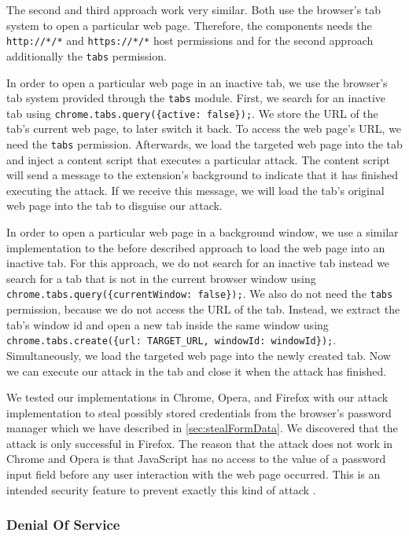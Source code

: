 	The second and third approach work very similar. Both use the browser's tab system to open a particular web page. Therefore, the components needs the \texttt{http://*/*} and \texttt{https://*/*} host permissions and for the second approach additionally the \texttt{tabs} permission.
	
	In order to open a particular web page in an inactive tab, we use the browser's tab system provided through the \texttt{tabs} module. First, we search for an inactive tab using \lstinline|chrome.tabs.query({active: false});|. We store the URL of the tab's current web page, to later switch it back. To access the web page's URL, we need the \texttt{tabs} permission. Afterwards, we load the targeted web page into the tab and inject a content script that executes a particular attack. The content script will send a message to the extension's background to indicate that it has finished executing the attack. If we receive this message, we will load the tab's original web page into the tab to disguise our attack.
	
	In order to open a particular web page in a background window, we use a similar implementation to the before described approach to load the web page into an inactive tab. For this approach, we do not search for an inactive tab instead we search for a tab that is not in the current browser window using \lstinline|chrome.tabs.query({currentWindow: false});|. We also do not need the \texttt{tabs} permission, because we do not access the URL of the tab. Instead, we extract the tab's window id and open a new tab inside the same window using \lstinline|chrome.tabs.create({url: TARGET_URL, windowId: windowId});|. Simultaneously, we load the targeted web page into the newly created tab. Now we can execute our attack in the tab and close it when the attack has finished.
	
	We tested our implementations in Chrome, Opera, and Firefox with our attack implementation to steal possibly stored credentials from the browser's password manager which we have described in \autoref{sec:stealFormData}. We discovered that the attack is only successful in Firefox. The reason that the attack does not work in Chrome and Opera is that JavaScript has no access to the value of a password input field before any user interaction with the web page occurred. This is an intended security feature to prevent exactly this kind of attack \cite{chromiumBlogPasswordInput}.


\subsubsection{Denial Of Service}
\label{sec:DoS}
	
